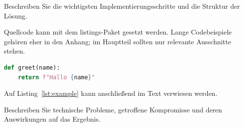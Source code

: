 
Beschreiben Sie die wichtigsten Implementierungsschritte und die Struktur der
Lösung.

Quellcode kann mit dem listings-Paket gesetzt werden. Lange Codebeispiele
gehören eher in den Anhang; im Hauptteil sollten nur relevante Ausschnitte
stehen.

\begin{lstlisting}[language=Python,caption={Kurzes Beispiel fuer ein Listing},label={lst:example}]
def greet(name):
    return f"Hallo {name}"
\end{lstlisting}

Auf Listing~\ref{lst:example} kann anschließend im Text verwiesen werden.

Beschreiben Sie technische Probleme, getroffene Kompromisse und deren
Auswirkungen auf das Ergebnis.
